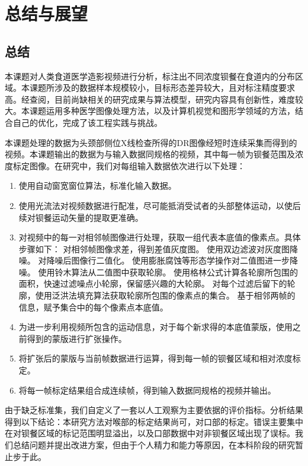 \section{总结与展望}\label{sec:-1}

\subsection{总结}

本课题对人类食道医学造影视频进行分析，标注出不同浓度钡餐在食道内的分布区域。本课题所涉及的数据样本规模较小，目标形态差异较大，且对标注精度要求高。经查阅，目前尚缺相关的研究成果与算法模型，研究内容具有创新性，难度较大。本课题运用多种医学图像处理方法，以及计算机视觉和图形学领域的方法，结合自己的优化，完成了该工程实践与挑战。

本课题处理的数据为头颈部侧位X线检查所得的DR图像经短时连续采集而得到的视频。本课题输出的数据为与输入数据同规格的视频，其中每一帧为钡餐范围及浓度标定图像。在研究中，我们对每组输入数据依次进行以下处理：
\begin{enumerate}
    \item 使用自动窗宽窗位算法，标准化输入数据。
    \item 使用光流法对视频数据进行配准，尽可能抵消受试者的头部整体运动，以使后续对钡餐运动矢量的提取更准确。
    \item 对视频中的每一对相邻帧图像进行处理，获取一组代表本底值的像素点。具体步骤如下：
    \subitem 对相邻帧图像求差，得到差值灰度图。
    \subitem 使用双边滤波对灰度图降噪。
    \subitem 对降噪后图像行二值化。
    \subitem 使用膨胀腐蚀等形态学操作对二值图进一步降噪。
    \subitem 使用铃木算法从二值图中获取轮廓。
    \subitem 使用格林公式计算各轮廓所包围的面积，快速过滤噪点小轮廓，保留感兴趣的大轮廓。
    \subitem 对每个过滤后留下的轮廓，使用泛洪法填充算法获取轮廓所包围的像素点的集合。
    \subitem 基于相邻两帧的信息，赋予集合中的每个像素点本底值。
    \item 为进一步利用视频所包含的运动信息，对于每个新求得的本底值蒙版，使用之前得到的蒙版进行扩张操作。
    \item 将扩张后的蒙版与当前帧数据进行运算，得到每一帧的钡餐区域和相对浓度标定。
    \item 将每一帧标定结果组合成连续帧，得到输入数据同规格的视频并输出。
\end{enumerate}

由于缺乏标准集，我们自定义了一套以人工观察为主要依据的评价指标。分析结果得到以下结论：本研究方法对喉部的标定结果尚可，对口部的标定。错误主要集中在对钡餐区域的标记范围明显溢出，以及口部数据中对非钡餐区域出现了误标。我们总结问题并提出改进方案，但由于个人精力和能力等原因，在本科阶段的研究暂止步于此。

